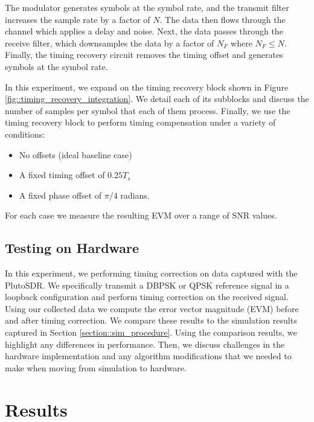 \documentclass{article}
\begin{document}
\noindent The modulator generates symbols at the symbol rate, and the transmit filter increases the sample rate by a factor of $N$. The data then flows through the channel which applies a delay and noise. Next, the data passes through the receive filter, which downsamples the data by a factor of $N_F$ where $N_F \leq N$. Finally, the timing recovery circuit removes the timing offset and generates symbols at the symbol rate.

	In this experiment, we expand on the timing recovery block shown in Figure \ref{fig::timing_recovery_integration}. We detail each of its subblocks and discuss the number of samples per symbol that each of them process. Finally, we use the timing recovery block to perform timing compensation under a variety of conditions:
	
	\begin{itemize}
		\item No offsets (ideal baseline case)
		\item A fixed timing offset of $0.25T_s$
		\item A fixed phase offset of $\pi/4$ radians.
	\end{itemize}	
	
	\noindent For each case we measure the resulting EVM over a range of SNR values.
	
\subsection{Testing on Hardware}

In this experiment, we performing timing correction on data captured with the PlutoSDR. We specifically transmit a DBPSK or QPSK reference signal in a loopback configuration and perform timing correction on the received signal. Using our collected data we compute the error vector magnitude (EVM) before and after timing correction. We compare these results to the simulation results captured in Section \ref{section::sim_procedure}. Using the comparison results, we highlight any differences in performance. Then, we discuss challenges in the hardware implementation and any algorithm modifications that we needed to make when moving from simulation to hardware.

\section{Results}
\end{document}
